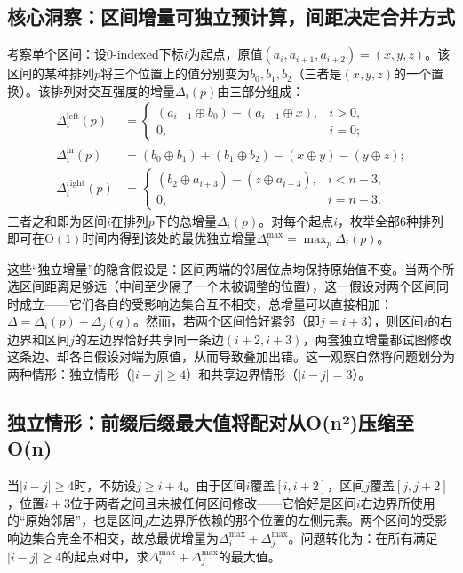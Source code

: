 \subsection{核心洞察：区间增量可独立预计算，间距决定合并方式}

考察单个区间：设0-indexed下标$i$为起点，原值$(a_i,a_{i+1},a_{i+2})=(x,y,z)$。该区间的某种排列$p$将三个位置上的值分别变为$b_0,b_1,b_2$（三者是$(x,y,z)$的一个置换）。该排列对交互强度的增量$\Delta_i(p)$由三部分组成：
\[
\begin{aligned}
\Delta_i^{\text{left}}(p) &=
\begin{cases}
(a_{i-1}\oplus b_0)-(a_{i-1}\oplus x), & i>0,\\
0, & i=0;
\end{cases}\\[4pt]
\Delta_i^{\text{in}}(p) &= (b_0\oplus b_1)+(b_1\oplus b_2)-(x\oplus y)-(y\oplus z);\\[4pt]
\Delta_i^{\text{right}}(p) &=
\begin{cases}
(b_2\oplus a_{i+3})-(z\oplus a_{i+3}), & i<n-3,\\
0, & i=n-3.
\end{cases}
\end{aligned}
\]
三者之和即为区间$i$在排列$p$下的总增量$\Delta_i(p)$。对每个起点$i$，枚举全部$6$种排列即可在$\mathrm{O}(1)$时间内得到该处的最优独立增量$\Delta_i^{\max}=\max_p\Delta_i(p)$。

这些“独立增量”的隐含假设是：区间两端的邻居位点均保持原始值不变。当两个所选区间距离足够远（中间至少隔了一个未被调整的位置），这一假设对两个区间同时成立——它们各自的受影响边集合互不相交，总增量可以直接相加：$\Delta=\Delta_i(p)+\Delta_j(q)$。然而，若两个区间恰好紧邻（即$j=i+3$），则区间$i$的右边界和区间$j$的左边界恰好共享同一条边$(i+2,i+3)$，两套独立增量都试图修改这条边、却各自假设对端为原值，从而导致叠加出错。这一观察自然将问题划分为两种情形：独立情形（$|i-j|\ge 4$）和共享边界情形（$|i-j|=3$）。

\subsection{独立情形：前缀后缀最大值将配对从O(n²)压缩至O(n)}

当$|i-j|\ge 4$时，不妨设$j\ge i+4$。由于区间$i$覆盖$[i,i+2]$，区间$j$覆盖$[j,j+2]$，位置$i+3$位于两者之间且未被任何区间修改——它恰好是区间$i$右边界所使用的“原始邻居”，也是区间$j$左边界所依赖的那个位置的左侧元素。两个区间的受影响边集合完全不相交，故总最优增量为$\Delta_i^{\max}+\Delta_j^{\max}$。问题转化为：在所有满足$|i-j|\ge 4$的起点对中，求$\Delta_i^{\max}+\Delta_j^{\max}$的最大值。


